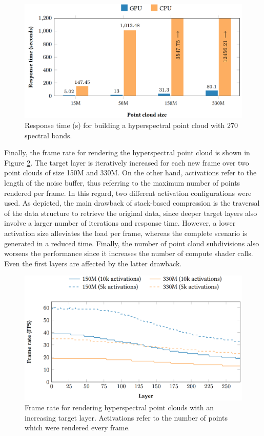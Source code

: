 \begin{figure}[bt]
    \centering
    \includegraphics[width=\linewidth]{figs/hyper_point_cloud/compression_results.png}
	\caption{Response time (\si{\second}) for building a hyperspectral point cloud with 270 spectral bands. }
	\label{fig:hyper_compression_results}
\end{figure}

Finally, the frame rate for rendering the hyperspectral point cloud is shown in Figure \ref{fig:hyper_fps_performance}. The target layer is iteratively increased for each new frame over two point clouds of size 150M and 330M. On the other hand, activations refer to the length of the noise buffer, thus referring to the maximum number of points rendered per frame. In this regard, two different activation configurations were used. As depicted, the main drawback of stack-based compression is the traversal of the data structure to retrieve the original data, since deeper target layers also involve a larger number of iterations and response time. However, a lower activation size alleviates the load per frame, whereas the complete scenario is generated in a reduced time. Finally, the number of point cloud subdivisions also worsens the performance since it increases the number of compute shader calls. Even the first layers are affected by the latter drawback. 

\begin{figure}[bt]
    \centering
    \includegraphics[width=\linewidth]{figs/hyper_point_cloud/hyper_fps_results.png}
	\caption{Frame rate for rendering hyperspectral point clouds with an increasing target layer. Activations refer to the number of points which were rendered every frame. }
	\label{fig:hyper_fps_performance}
\end{figure}

